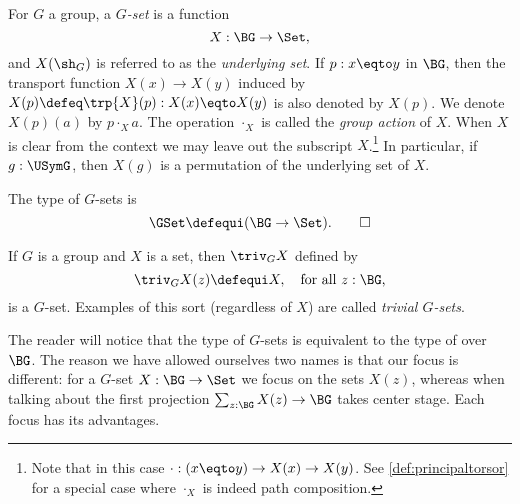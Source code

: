 
\begin{definition}\label{def:Gset}
  For $G$ a group, a \emph{$G$-set} is a function
  \[
    X : \BG\to\Set,
  \]
  and $X(\sh_G)$ is referred to as the \emph{underlying set}.
  If $p:x\eqto y$ in $\BG$,
  then the transport function $X(x)\to X(y)$ induced
  by $X(p)\defeq\trp{X}(p) : X(x)\eqto X(y)$ is also denoted by $X(p)$.
  We denote $X(p)(a)$ by $p\cdot_X a$.
  The operation $\cdot_X$ is called the \emph{group action} of $X$.
  When $X$ is clear from the context we may leave out the
  subscript $X$.\footnote{%
    Note that in this case $\cdot: (x\eqto y) \to X(x) \to X(y)$.
    See \cref{def:principaltorsor} for a special case
    where $\cdot_X$ is indeed path composition.}
  In particular, if $g:\USymG$,
  then $X(g)$ is a permutation of the underlying set of $X$.

  The type of $G$-sets is
  \[
    \GSet\defequi(\BG\to\Set).\qedhere
  \]
\end{definition}

\begin{example}\label{def:trivGset}
  If $G$ is a group and $X$ is a set, then $\triv_G X$ defined by
  \[\triv_G X(z)\defequi X, \quad\text{for all $z:\BG$,}\]
  is a $G$-set.
  Examples of this sort (regardless of $X$) are called \emph{trivial $G$-sets}.
\end{example}
\begin{remark}

The reader will notice that the type of $G$-sets is equivalent to the
type of \coverings over $\BG$.
The reason we have allowed ourselves two names is that our focus is different: for a $G$-set $X:\BG\to\Set$ we focus on the sets $X(z)$, whereas when talking about \coverings the first projection $\sum_{z:\BG}X(z)\to \BG$ takes center stage.  Each focus has its advantages.
\end{remark}

